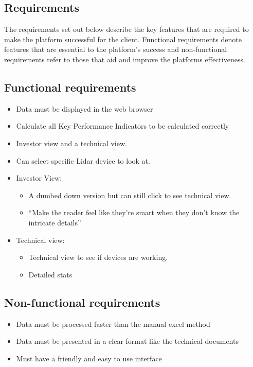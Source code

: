 \documentclass{article}
\begin{document}
\begin{multicols}{2}
    \section{Requirements}
    The requirements set out below describe the key features that are required to make the platform successful for the client. Functional requirements denote features that are essential to the platform's success and non-functional requirements refer to those that aid and improve the platforms effectiveness.
    \subsection{Functional requirements}
    \begin{itemize}
        \item Data must be displayed in the web browser 
        \item Calculate all Key Performance Indicators to be calculated correctly 
        \item Investor view and a technical view. 
        \item Can select specific Lidar device to look at. 
        \item Investor View: 
        \begin{itemize}
            \item A dumbed down version but can still click to see technical view. 
            \item “Make the reader feel like they’re smart when they don’t know the intricate details” 
        \end{itemize}
        \item Technical view: 
            \begin{itemize}
                \item Technical view to see if devices are working. 
                \item Detailed stats 
            \end{itemize}
    \end{itemize}
    \subsection{Non-functional requirements}
    \begin{itemize}
        \item Data must be processed faster than the manual excel method 
        \item Data must be presented in a clear format like the technical documents 
        \item Must have a friendly and easy to use interface  
    \end{itemize}

\end{multicols}
\end{document}

